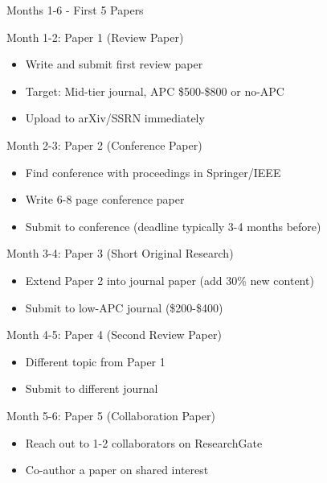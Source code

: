 \documentclass[11pt]{beamer}
\begin{document}
	\begin{frame}{Months 1-6 - First 5 Papers}
		\scriptsize
		\begin{block}{Month 1-2: Paper 1 (Review Paper)}
			\begin{itemize}
				\item Write and submit first review paper
				\item Target: Mid-tier journal, APC \$500-\$800 or no-APC
				\item Upload to arXiv/SSRN immediately
			\end{itemize}
		\end{block}
		\begin{block}{Month 2-3: Paper 2 (Conference Paper)}
			\begin{itemize}
				\item Find conference with proceedings in Springer/IEEE
				\item Write 6-8 page conference paper
				\item Submit to conference (deadline typically 3-4 months before)
			\end{itemize}
		\end{block}
		\begin{block}{Month 3-4: Paper 3 (Short Original Research)}
			\begin{itemize}
				\item Extend Paper 2 into journal paper (add 30\% new content)
				\item Submit to low-APC journal (\$200-\$400)
			\end{itemize}
		\end{block}
		\begin{block}{Month 4-5: Paper 4 (Second Review Paper)}
			\begin{itemize}
				\item Different topic from Paper 1
				\item Submit to different journal
			\end{itemize}
		\end{block}
		\begin{block}{Month 5-6: Paper 5 (Collaboration Paper)}
			\begin{itemize}
				\item Reach out to 1-2 collaborators on ResearchGate
				\item Co-author a paper on shared interest
			\end{itemize}
		\end{block}
	\end{frame}
	
\end{document}
